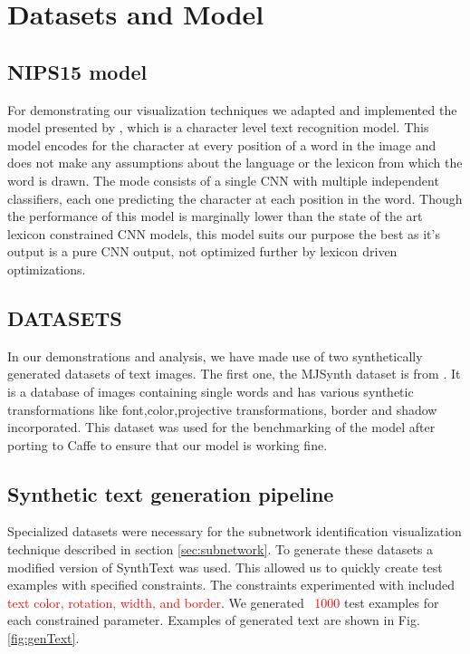\documentclass[10pt,twocolumn,letterpaper]{article}
\begin{document}
\section{Datasets and Model}

\subsection{NIPS15 model}
For demonstrating our visualization techniques we adapted and implemented the model presented by \cite{Jaderberg14c}, which is a character level text recognition model. This  model encodes for the character at every position of a word in the image and does not make any assumptions about the language or the lexicon from which the word is drawn. The  mode consists of a single CNN with multiple independent classifiers, each one predicting the character at each position in the word. Though the performance of this model is marginally lower than the state of the art lexicon constrained CNN models, this model suits our purpose the best as it's output is a pure CNN output, not optimized further by lexicon driven optimizations. 

\subsection{DATASETS}
In our demonstrations and analysis, we have made use of two synthetically generated datasets of text images. The first one, the MJSynth dataset is from \cite{Jaderberg14c}. It is a database of images containing single words and has various synthetic transformations like font,color,projective transformations, border and shadow incorporated. This dataset was used for the benchmarking of the model after porting to Caffe to ensure that our model is working fine. 

\subsection{Synthetic text generation pipeline} \label{sec:synthtext}
Specialized datasets were necessary for the subnetwork identification visualization technique described in section \ref{sec:subnetwork}.
To generate these datasets a modified version of SynthText \cite{Gupta16} was used. This allowed us to quickly create test examples with specified constraints. The constraints experimented with included \textcolor{red}{text color, rotation, width, and border}. We generated \textcolor{red}{~1000} test examples for each constrained parameter. Examples of generated text are shown in Fig. \ref{fig:genText}.
\end{document}
